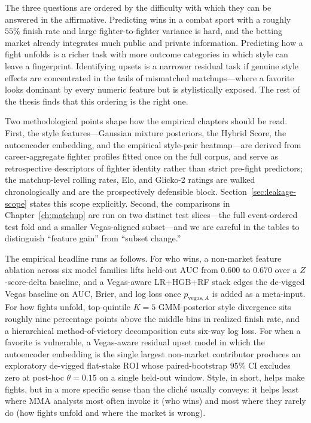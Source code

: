 \documentclass[12pt,oneside]{report}
\begin{document}
The three questions are ordered by the difficulty with which they can
be answered in the affirmative.  Predicting wins in a combat sport
with a roughly $55\%$ finish rate and large fighter-to-fighter
variance is hard, and the betting market already integrates much
public and private information.  Predicting how a fight unfolds is a
richer task with more outcome categories in which style can leave a
fingerprint.  Identifying upsets is a narrower residual task if genuine style
effects are concentrated in the tails of mismatched matchups---where
a favorite looks dominant by every numeric feature but is
stylistically exposed.  The rest of the thesis finds that this
ordering is the right one.

Two methodological points shape how the empirical chapters should be
read.  First, the style features---Gaussian mixture posteriors, the
Hybrid Score, the autoencoder embedding, and the empirical
style-pair heatmap---are derived from career-aggregate
fighter profiles fitted once on the full corpus, and serve as
retrospective descriptors of fighter identity rather than strict
pre-fight predictors; the matchup-level rolling rates, Elo, and
Glicko-2 ratings are walked chronologically and are the
prospectively defensible block.  Section~\ref{sec:leakage-scope}
states this scope explicitly.  Second, the comparisons in
Chapter~\ref{ch:matchup} are run on two distinct test slices---the
full event-ordered test fold and a smaller Vegas-aligned subset---and
we are careful in the tables to distinguish ``feature gain'' from
``subset change.''

The empirical headline runs as follows.  For who wins, a
non-market feature ablation across six model families lifts held-out AUC from
$0.600$ to $0.670$ over a $Z$-score-delta baseline, and a
Vegas-aware LR$+$HGB$+$RF stack edges the de-vigged Vegas baseline on
AUC, Brier, and log loss once \(p_{\mathrm{vegas},A}\) is added as a
meta-input.  For how fights unfold, top-quintile \(K = 5\)
GMM-posterior style divergence sits roughly nine percentage points above the middle bins in realized finish rate, and a hierarchical method-of-victory decomposition cuts
six-way log loss.  For when a favorite is vulnerable, a
Vegas-aware residual upset model in which the autoencoder embedding
is the single largest non-market contributor produces an exploratory de-vigged
flat-stake ROI whose paired-bootstrap $95\%$ CI excludes zero at post-hoc \(\theta = 0.15\) on a
single held-out window.  Style, in short, helps make fights, but
in a more specific sense than the cliché usually conveys: it helps
least where MMA analysts most often invoke it (who wins) and most
where they rarely do (how fights unfold and where the market is wrong).
\end{document}
